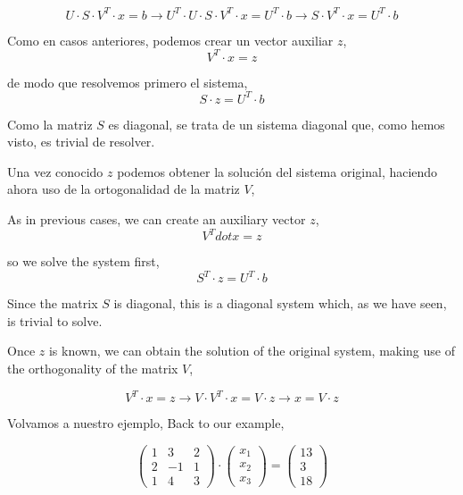 \begin{equation*}
U\cdot S\cdot V^T\cdot x=b \rightarrow U^T\cdot U\cdot S\cdot V^T \cdot x= U^T\cdot b \rightarrow S\cdot V^T \cdot x=U^T\cdot b
\end{equation*}

\begin{paracol}{2}
Como en casos anteriores, podemos crear un vector auxiliar $z$,
\begin{equation*}
V^T\cdot x=z
\end{equation*}

de modo que resolvemos primero el sistema,
\begin{equation*}
S\cdot z= U^T\cdot b
\end{equation*}

Como la matriz $S$ es diagonal, se trata de un sistema diagonal que, como hemos visto, es trivial de resolver.

Una vez conocido $z$ podemos obtener la solución del sistema original, haciendo ahora uso de la ortogonalidad de la matriz $V$,

\switchcolumn

As in previous cases, we can create an auxiliary vector $z$,
\begin{equation*}
V^Tdot x=z
\end{equation*}

so we solve the system first,
\begin{equation*}
S^T\cdot z= U^T\cdot b
\end{equation*}

Since the matrix $S$ is diagonal, this is a diagonal system which, as we have seen, is trivial to solve.

Once $z$ is known, we can obtain the solution of the original system, making use of the orthogonality of the matrix $V$,
\end{paracol}


\begin{equation*}
V^T\cdot x=z \rightarrow V\cdot V^T\cdot x=V\cdot z \rightarrow x=V\cdot z
\end{equation*}

\begin{paracol}{2}
Volvamos a nuestro ejemplo,
\switchcolumn
Back to our example,
\end{paracol}


\begin{equation*}
\begin{pmatrix}
1& 3& 2\\
2& -1& 1\\
1& 4& 3
\end{pmatrix}\cdot \begin{pmatrix}
x_1\\
x_2\\
x_3
\end{pmatrix}=\begin{pmatrix}
13\\
3\\
18
\end{pmatrix}
\end{equation*}

